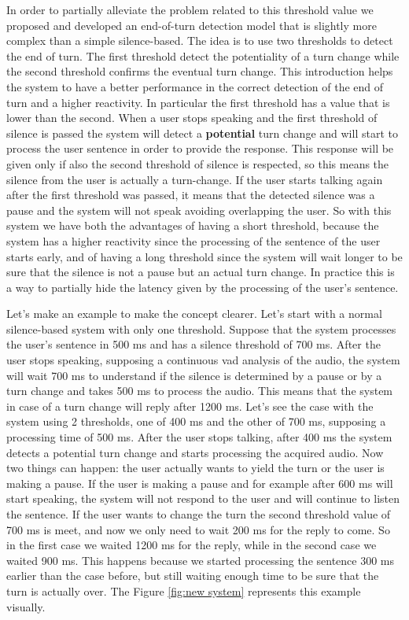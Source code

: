 \documentclass[../main.tex]{subfiles}
\begin{document}
In order to partially alleviate the problem related to this threshold value we proposed and developed an end-of-turn detection model that is slightly more complex than a simple silence-based. The idea is to use two thresholds to detect the end of turn. The first threshold detect the potentiality of a turn change while the second threshold confirms the eventual turn change. This introduction helps the system to have a better performance in the correct detection of the end of turn and a higher reactivity. In particular the first threshold has a value that is lower than the second. When a user stops speaking and the first threshold of silence is passed the system will detect a \textbf{potential} turn change and will start to process the user sentence in order to provide the response. This response will be given only if also the second threshold of silence is respected, so this means the silence from the user is actually a turn-change. If the user starts talking again after the first threshold was passed, it means that the detected silence was a pause and the system will not speak avoiding overlapping the user. So with this system we have both the advantages of having a short threshold, because the system has a higher reactivity since the processing of the sentence of the user starts early, and of having a long threshold since the system will wait longer to be sure that the silence is not a pause but an actual turn change. In practice this is a way to partially hide the latency given by the processing of the user's sentence. 

Let's make an example to make the concept clearer. Let's start with a normal silence-based system with only one threshold. Suppose that the system processes the user's sentence in 500 ms and has a silence threshold of 700 ms. After the user stops speaking, supposing a continuous vad analysis of the audio, the system will wait 700 ms to understand if the silence is determined by a pause or by a turn change and takes 500 ms to process the audio. This means that the system in case of a turn change will reply after 1200 ms. Let's see the case with the system using 2 thresholds, one of 400 ms and the other of 700 ms, supposing a processing time of 500 ms. After the user stops talking, after 400 ms the system detects a potential turn change and starts processing the acquired audio. Now two things can happen: the user actually wants to yield the turn or the user is making a pause. If the user is making a pause and for example after 600 ms will start speaking, the system will not respond to the user and will continue to listen the sentence. If the user wants to change the turn the second threshold value of 700 ms is meet, and now we only need to wait 200 ms for the reply to come. So in the first case we waited 1200 ms for the reply, while in the second case we waited 900 ms. This happens because we started processing the sentence 300 ms earlier than the case before, but still waiting enough time to be sure that the turn is actually over. The Figure \ref{fig:new system} represents this example visually.
\end{document}
